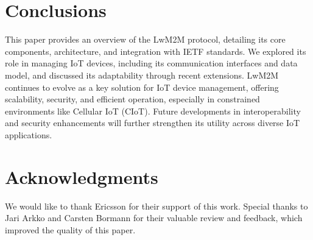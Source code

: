 \documentclass[11pt,sigconf]{iabart}
\begin{document}
\section{Conclusions} \label{conclusions}

This paper provides an overview of the LwM2M protocol, detailing its core components, architecture, and integration with IETF standards. We explored its role in managing IoT devices, including its communication interfaces and data model, and discussed its adaptability through recent extensions. LwM2M continues to evolve as a key solution for IoT device management, offering scalability, security, and efficient operation, especially in constrained environments like Cellular IoT (CIoT). Future developments in interoperability and security enhancements will further strengthen its utility across diverse IoT applications.


\section{Acknowledgments}

We would like to thank Ericsson for their support of this work. Special thanks to Jari Arkko and Carsten Bormann for their valuable review and feedback, which improved the quality of this paper.



\end{document}
